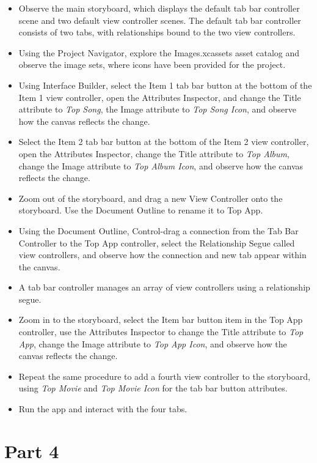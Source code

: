 \documentclass[a4paper,11pt]{scrartcl}
\begin{document}
\begin{itemize}
\item Observe the main storyboard, which displays the default tab bar controller scene and two default view controller scenes. The default tab bar controller consists of two tabs, with relationships bound to the two view controllers.
\item Using the Project Navigator, explore the Images.xcassets asset catalog and observe the image sets, where icons have been provided for the project.
\item Using Interface Builder, select the Item 1 tab bar button at the bottom of the Item 1 view controller, open the Attributes Inspector, and change the Title attribute to \textit{Top Song}, the Image attribute to \textit{Top Song Icon}, and observe how the canvas reflects the change.
\item Select the Item 2 tab bar button at the bottom of the Item 2 view controller, open the Attributes Inspector, change the Title attribute to \textit{Top Album}, change the Image attribute to \textit{Top Album Icon}, and observe how the canvas reflects the change.
\item Zoom out of the storyboard, and drag a new View Controller onto the storyboard. Use the Document Outline to rename it to Top App.
\item Using the Document Outline, Control-drag a connection from the Tab Bar Controller to the Top App controller, select the Relationship Segue called view controllers, and observe how the connection and new tab appear within the canvas.
\item A tab bar controller manages an array of view controllers using a relationship segue.
\item Zoom in to the storyboard, select the Item bar button item in the Top App controller, use the Attributes Inspector to change the Title attribute to \textit{Top App}, change the Image attribute to \textit{Top App Icon}, and observe how the canvas reflects the change.
\item Repeat the same procedure to add a fourth view controller to the storyboard, using \textit{Top Movie} and \textit{Top Movie Icon} for the tab bar button attributes.
\item Run the app and interact with the four tabs.
\end{itemize}

\section*{Part 4}
\end{document}
